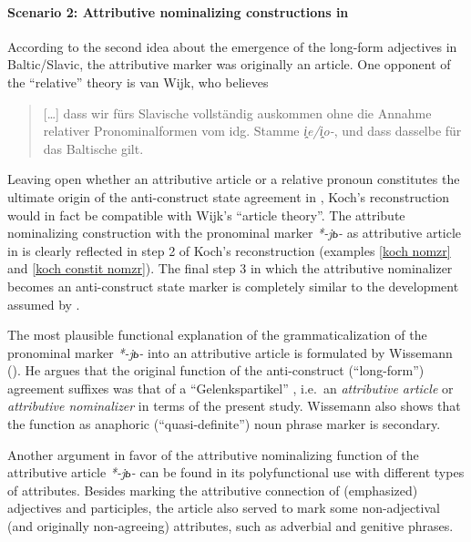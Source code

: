 \paragraph{Scenario 2: Attributive nominalizing constructions in } 
According to the second idea about the emergence of the long-form adjectives in Baltic\slash{}Slavic, the attributive marker was originally an article. One opponent of the “relative” theory is van Wijk, who believes 
\begin{quote}
[\dots] dass wir fürs Slavische vollständig auskommen ohne die Annahme relativer Pronominalformen vom idg. Stamme \textit{i̭e/i̭o-}, und dass dasselbe für das Baltische gilt. \citep[28]{wijk1935}%
\end{quote}
Leaving open whether an attributive article or a relative pronoun constitutes the ultimate origin of the anti-construct state agreement in , Koch's reconstruction would in fact be compatible with Wijk's “article theory”. The attribute nominalizing construction with the pronominal marker \textit{*-jь-} as attributive article in  is clearly reflected in step 2 of Koch's reconstruction (examples \ref{koch nomzr} and \ref{koch constit nomzr}). The final step 3 in which the attributive nominalizer becomes an anti-construct state marker is completely similar to the development assumed by \cite{wijk1935}.

The most plausible functional explanation of the grammaticalization of the pronominal marker \textit{*-jь-} into an attributive article is formulated by Wissemann (\citeyear{wissemann1958}). He argues that the original function of the anti-construct (“long-form”) agreement suffixes was that of a “Gelenkspartikel” \citep[76]{wissemann1958}, i.e.~an \textit{attributive article} or \textit{attributive nominalizer} in terms of the present study. Wissemann also shows that the function as anaphoric (“quasi-definite”) noun phrase marker is secondary.

Another argument in favor of the attributive nominalizing function of the  attributive article \textit{*-jь-} can be found in its polyfunctional use with different types of attributes. Besides marking the attributive connection of (emphasized) adjectives and participles, the article also served to mark some non-adjectival (and originally non-agreeing) attributes, such as adverbial and genitive phrases.


